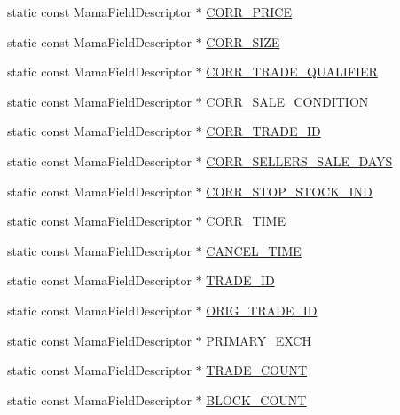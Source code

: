 \begin{CompactItemize}
\item 
static const Mama\-Field\-Descriptor $\ast$ \hyperlink{classWombat_1_1MamdaTradeFields_cba894ca00b326c2a205264900bcf66e}{CORR\_\-PRICE}
\item 
static const Mama\-Field\-Descriptor $\ast$ \hyperlink{classWombat_1_1MamdaTradeFields_d008a5963d9faf440be04b61f8dcccb9}{CORR\_\-SIZE}
\item 
static const Mama\-Field\-Descriptor $\ast$ \hyperlink{classWombat_1_1MamdaTradeFields_680194565d0cd7c7a61ba9c36955bc4c}{CORR\_\-TRADE\_\-QUALIFIER}
\item 
static const Mama\-Field\-Descriptor $\ast$ \hyperlink{classWombat_1_1MamdaTradeFields_40c013ec1bc3127ce7f9558214a38a77}{CORR\_\-SALE\_\-CONDITION}
\item 
static const Mama\-Field\-Descriptor $\ast$ \hyperlink{classWombat_1_1MamdaTradeFields_fbcd6a93c569892c7ba3c93a1d6f5ceb}{CORR\_\-TRADE\_\-ID}
\item 
static const Mama\-Field\-Descriptor $\ast$ \hyperlink{classWombat_1_1MamdaTradeFields_c9e9f2460c98449fbd35d329cf9e5198}{CORR\_\-SELLERS\_\-SALE\_\-DAYS}
\item 
static const Mama\-Field\-Descriptor $\ast$ \hyperlink{classWombat_1_1MamdaTradeFields_4980f61d0f62f5a65e88438a58b4ffd8}{CORR\_\-STOP\_\-STOCK\_\-IND}
\item 
static const Mama\-Field\-Descriptor $\ast$ \hyperlink{classWombat_1_1MamdaTradeFields_fa751421a24f890f68730ea770f0f825}{CORR\_\-TIME}
\item 
static const Mama\-Field\-Descriptor $\ast$ \hyperlink{classWombat_1_1MamdaTradeFields_59d45f7dbd5ca2dd105c8eef8f1b394e}{CANCEL\_\-TIME}
\item 
static const Mama\-Field\-Descriptor $\ast$ \hyperlink{classWombat_1_1MamdaTradeFields_5b403a15990d1d1d880cf948bc518dc2}{TRADE\_\-ID}
\item 
static const Mama\-Field\-Descriptor $\ast$ \hyperlink{classWombat_1_1MamdaTradeFields_63e9b5118fcfc41a004a4e7b233c98b8}{ORIG\_\-TRADE\_\-ID}
\item 
static const Mama\-Field\-Descriptor $\ast$ \hyperlink{classWombat_1_1MamdaTradeFields_d125cc538dd14188b01bbe541d32730a}{PRIMARY\_\-EXCH}
\item 
static const Mama\-Field\-Descriptor $\ast$ \hyperlink{classWombat_1_1MamdaTradeFields_1fba98a60e6df31d9e81752e774da724}{TRADE\_\-COUNT}
\item 
static const Mama\-Field\-Descriptor $\ast$ \hyperlink{classWombat_1_1MamdaTradeFields_a29616e4fa10016edb9ce81a8077dcd6}{BLOCK\_\-COUNT}

\end{CompactItemize}
